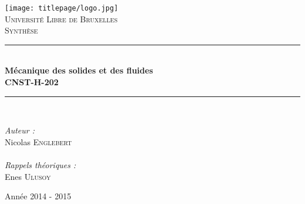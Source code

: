 \AddToShipoutPicture*{\BackgroundPic}
\begin{titlepage}
	\begin{center}	
			
		\newcommand{\HRule}{\rule{\linewidth}{0.5mm}}   			%
		\texttt{[image: titlepage/logo.jpg]}~\\[1cm]				%
			
			\textsc{\LARGE Université Libre de Bruxelles}\\[1.5cm]
			\textsc{\Large Synthèse}\\[0.5cm]
			
			\HRule \\[0.4cm]
			{ \huge \bfseries Mécanique des solides et des fluides\ \\CNST-H-202 \\[0.4cm] }
			
			\HRule \\[1.5cm]
			\begin{minipage}{0.4\textwidth}
				\begin{flushleft} \large
							
					\emph{Auteur :}\\
					Nicolas \textsc{Englebert}\\
					\ \\
					\emph{Rappels théoriques :}\\
					Enes \textsc{Ulusoy}
					
				\end{flushleft}
			\end{minipage}
			\begin{minipage}{0.4\textwidth}
				\begin{flushright} \large
				\end{flushright}
			\end{minipage}
			
			\vfill
			
			{\large Année 2014 - 2015}
			
		\end{center}
	\end{titlepage}